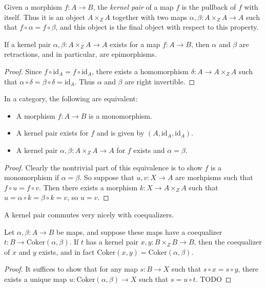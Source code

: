 Given a morphism $f: A \to B$, the \emph{kernel pair} of a map $f$ is the pullback of $f$ with itself. Thus it is an object $A \times_Z A$ together with two maps $\alpha, \beta: A \times_Z A \to A$ such that $f \circ \alpha = f \circ \beta$, and this object is the final object with respect to this property.

\begin{lemma}
    If a kernel pair $\alpha,\beta: A \times_Z A \to A$ exists for a map $f: A \to B$, then $\alpha$ and $\beta$ are retractions, and in particular, are epimorphisms.
\end{lemma}
\begin{proof}
    Since $f \circ \text{id}_A = f \circ \text{id}_A$, there exists a homomorphism $\delta: A \to A \times_Z A$ such that $\alpha \circ \delta = \beta \circ \delta = \text{id}_A$. Thus $\alpha$ and $\beta$ are right invertible.
\end{proof}

\begin{lemma}
    In a category, the following are equivalent:
    \begin{itemize}
        \item A morphism $f: A \to B$ is a monomorphism.
        \item A kernel pair exists for $f$ and is given by $(A,\text{id}_A, \text{id}_A)$.
        \item A kernel pair $\alpha,\beta: A \times_Z A \to A$ for $f$ exists and $\alpha = \beta$.
    \end{itemize}
\end{lemma}
\begin{proof}
    Clearly the nontrivial part of this equivalence is to show $f$ is a monomorphism if $\alpha = \beta$. So suppose that $u,v: X \to A$ are morhpisms such that $f \circ u = f \circ v$. Then there exists a morphism $k: X \to A \times_Z A$ such that $u = \alpha \circ k = \beta \circ k = v$, so $u = v$.
\end{proof}

A kernel pair commutes very nicely with coequalizers.

\begin{lemma}
    Let $\alpha,\beta: A \to B$ be maps, and suppose these maps have a coequalizer $t: B \to \text{Coker}(\alpha,\beta)$. If $t$ has a kernel pair $x,y: B \times_Z B \to B$, then the coequalizer of $x$ and $y$ exists, and in fact $\text{Coker}(x,y) = \text{Coker}(\alpha,\beta)$.
\end{lemma}
\begin{proof}
    It suffices to show that for any map $s: B \to X$ such that $s \circ x = s \circ y$, there exists a unique map $u: \text{Coker}(\alpha,\beta) \to X$ such that $s = u \circ t$. TODO
\end{proof}

